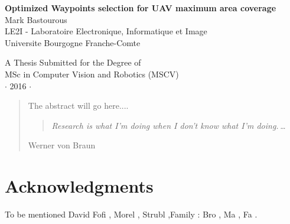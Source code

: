 
\newpage
\thispagestyle{empty}


\vspace*{2cm}
\begin{center}
{\Large\bf Optimized Waypoints selection for UAV maximum area coverage\\} \vspace{2cm} {\large
Mark Bastourous\\
\vspace{2cm}
LE2I - Laboratoire Electronique, Informatique et Image \\
Universite Bourgogne Franche-Comte}\\


\end{center}

\vspace{7cm}
\begin{center}
{\large A Thesis Submitted for the Degree of \\MSc in Computer Vision and Robotics 
(MSCV) \\\vspace{0.3cm} $\cdot$ 2016
$\cdot$}
\end{center}
\singlespacing


\begin{abstract}
The abstract will go here....

\vspace*{5cm}



\begin{center}
\begin{quote}
\it Research is what I'm doing when I don't know what I'm
doing.\,\ldots
\end{quote}
\end{center}
\hfill{\small Werner von Braun}

\end{abstract}

\doublespacing

\setcounter{page}{1} \pagestyle{plain}


\tableofcontents

\listoffigures
\listoftables

\chapter*{Acknowledgments}

         {\protect{}}
To be mentioned David Fofi , Morel , Strubl
,Family : Bro , Ma , Fa .

\pagestyle{fancy}
